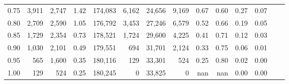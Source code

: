 \begin{tabular}{rrrrrrrrrrrrrr}
0.75 &   3,911 &  2,747 &    1.42 &  174,083 &    6,162 &  24,656 &   9,169 &  0.67 &  0.60 &  0.27 &      0.07 \\
0.80 &   2,709 &  2,590 &    1.05 &  176,792 &    3,453 &  27,246 &   6,579 &  0.52 &  0.66 &  0.19 &      0.05 \\
0.85 &   1,729 &  2,354 &    0.73 &  178,521 &    1,724 &  29,600 &   4,225 &  0.41 &  0.71 &  0.12 &      0.03 \\
0.90 &   1,030 &  2,101 &    0.49 &  179,551 &      694 &  31,701 &   2,124 &  0.33 &  0.75 &  0.06 &      0.01 \\
0.95 &     565 &  1,600 &    0.35 &  180,116 &      129 &  33,301 &     524 &  0.25 &  0.80 &  0.02 &      0.00 \\
1.00 &     129 &    524 &    0.25 &  180,245 &        0 &  33,825 &       0 &   nan &   nan &  0.00 &      0.00 \\
\bottomrule
\end{tabular}
